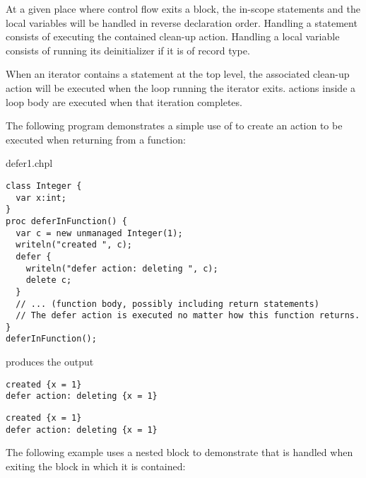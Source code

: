 At a given place where control flow exits a block, the in-scope
 statements and the local variables will be handled in
reverse declaration order. Handling a  statement consists of
executing the contained clean-up action. Handling a local variable
consists of running its deinitializer if it is of record type.

When an iterator contains a  statement at the top level, the
associated clean-up action will be executed when the loop running the
iterator exits.  actions inside a loop body are executed
when that iteration completes.

The following program demonstrates a simple use of 
to create an action to be executed when returning from a function:

\begin{chapelexample}{defer1.chpl}
\begin{chapel}
\begin{verbatim}
class Integer {
  var x:int;
}
proc deferInFunction() {
  var c = new unmanaged Integer(1);
  writeln("created ", c);
  defer {
    writeln("defer action: deleting ", c);
    delete c;
  }
  // ... (function body, possibly including return statements)
  // The defer action is executed no matter how this function returns.
}
deferInFunction();
\end{verbatim}
\end{chapel}
produces the output
\begin{chapeloutput}
\begin{verbatim}
created {x = 1}
defer action: deleting {x = 1}
\end{verbatim}
\end{chapeloutput}
\begin{commandline}
\begin{verbatim}
created {x = 1}
defer action: deleting {x = 1}
\end{verbatim}
\end{commandline}
\end{chapelexample}


The following example uses a nested block to demonstrate that 
is handled when exiting the block in which it is contained:


